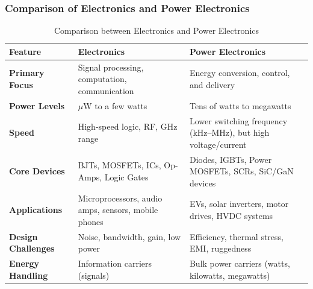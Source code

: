 \begin{frame}
	\frametitle{Comparison of Electronics and Power Electronics}
	\begin{table}[htbp] \small
		\centering
		\caption{Comparison between Electronics and Power Electronics} \footnotesize
		\begin{tabular}{|p{2.5cm}|p{4cm}|p{5cm}|}
		\hline
		\textbf{Feature} & \textbf{Electronics} & \textbf{Power Electronics} \\
		\hline
		\textbf{Primary Focus} & Signal processing, computation, communication & Energy conversion, control, and delivery \\
		\hline
		\textbf{Power Levels} & $\mu$W to a few watts & Tens of watts to megawatts \\
		\hline
		\textbf{Speed} & High-speed logic, RF, GHz range & Lower switching frequency (kHz–MHz), but high voltage/current \\
		\hline
		\textbf{Core Devices} & BJTs, MOSFETs, ICs, Op-Amps, Logic Gates & Diodes, IGBTs, Power MOSFETs, SCRs, SiC/GaN devices \\
		\hline
		\textbf{Applications} & Microprocessors, audio amps, sensors, mobile phones & EVs, solar inverters, motor drives, HVDC systems \\
		\hline
		\textbf{Design Challenges} & Noise, bandwidth, gain, low power & Efficiency, thermal stress, EMI, ruggedness \\
		\hline
		\textbf{Energy Handling} & Information carriers (signals) & Bulk power carriers (watts, kilowatts, megawatts) \\
		\hline
		\end{tabular}
		\end{table}
\end{frame}

